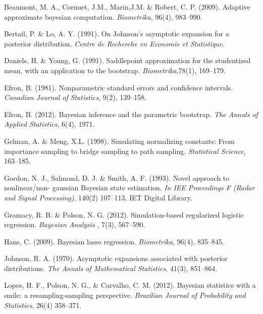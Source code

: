 \documentclass[12pt]{TD-CJS}
\begin{document}
\begin{thebibliography}{}

Beaumont, M. A.,  Cornuet, J.M.,  Marin,J.M. \& Robert, C. P. (2009). Adaptive approximate bayesian computation. {\it Biometrika}, 96(4), 983--990.

Bertail, P. \& Lo,  A. Y.  (1991). On Johnson's asymptotic expansion for a posterior distribution. {\it Centre de Recherche en Economie et Statistique}.

Daniels, H. \& Young, G.  (1991). Saddlepoint approximation for the studentized mean, with an application to the bootstrap. {\it Biometrika},78(1), 169--179.

Efron, B. (1981). Nonparametric standard errors and confidence intervals. {\it Canadian Journal of Statistics}, 9(2), 139--158.

Efron, B. (2012). Bayesian inference and the parametric bootstrap. {\it The Annals of Applied Statistics}, 6(4), 1971.

Gelman, A. \& Meng, X.L. (1998). Simulating normalizing constants: From importance sampling to bridge sampling to path sampling. {\it Statistical Science}, 163--185.

Gordon, N. J.,  Salmond, D. J. \&  Smith, A. F. (1993). Novel approach to nonlinear/non- gaussian Bayesian state estimation. {\it In IEE Proceedings F (Radar and Signal Processing)}, 140(2) 107--113, IET Digital Library.

Gramacy, R. B. \& Polson, N. G. (2012). Simulation-based regularized logistic regression. {\it Bayesian Analysis }, 7(3), 567--590.

Hans, C. (2009). Bayesian lasso regression. {\it Biometrika}, 96(4), 835--845.

Johnson, R. A. (1970). Asymptotic expansions associated with posterior distributions.
{\it The Annals of Mathematical Statistics}, 41(3), 851--864.

Lopes, H. F., Polson, N. G., \&  Carvalho, C. M. (2012). Bayesian statistics with a smile: a resampling-sampling perspective. {\it Brazilian Journal of Probability and Statistics}, 26(4) 358--371.


\end{thebibliography}
\end{document}

